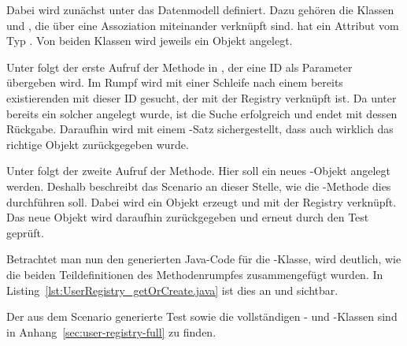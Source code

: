 
Dabei wird zunächst unter  das Datenmodell definiert.
Dazu gehören die Klassen  und , die über eine Assoziation miteinander verknüpft sind.
 hat ein Attribut  vom Typ .
Von beiden Klassen wird jeweils ein Objekt angelegt.

Unter  folgt der erste Aufruf der Methode  in , der eine ID als Parameter übergeben wird.
Im Rumpf wird mit einer Schleife nach einem bereits existierenden  mit dieser ID gesucht, der mit der Registry verknüpft ist.
Da unter  bereits ein solcher angelegt wurde, ist die Suche erfolgreich und endet mit dessen Rückgabe.
Daraufhin wird mit einem -Satz sichergestellt, dass auch wirklich das richtige Objekt zurückgegeben wurde.

Unter  folgt der zweite Aufruf der Methode.
Hier soll ein neues -Objekt angelegt werden.
Deshalb beschreibt das Scenario an dieser Stelle, wie die -Methode dies durchführen soll.
Dabei wird ein Objekt erzeugt und mit der Registry verknüpft.
Das neue Objekt wird daraufhin zurückgegeben und erneut durch den Test geprüft.

Betrachtet man nun den generierten Java-Code für die -Klasse, wird deutlich, wie die beiden Teildefinitionen des Methodenrumpfes zusammengefügt wurden.
In Listing~\ref{lst:UserRegistry_getOrCreate.java} ist dies an  und  sichtbar.


Der aus dem Scenario generierte Test sowie die vollständigen - und -Klassen sind in Anhang~\ref{sec:user-registry-full} zu finden.
